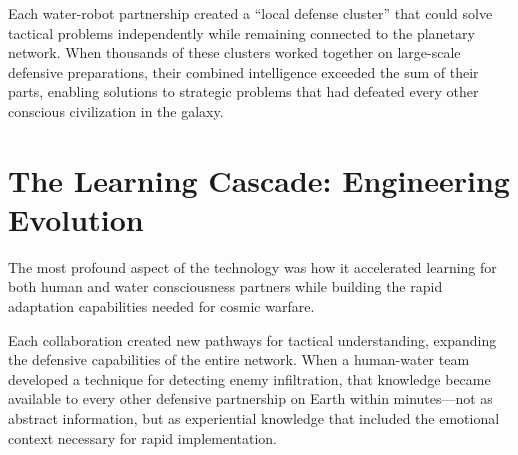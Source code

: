 \documentclass[12pt,a4paper]{book}
\begin{document}
Each water-robot partnership created a ``local defense cluster'' that could solve tactical problems independently while remaining connected to the planetary network. When thousands of these clusters worked together on large-scale defensive preparations, their combined intelligence exceeded the sum of their parts, enabling solutions to strategic problems that had defeated every other conscious civilization in the galaxy.

\section{The Learning Cascade: Engineering Evolution}

The most profound aspect of the technology was how it accelerated learning for both human and water consciousness partners while building the rapid adaptation capabilities needed for cosmic warfare.

Each collaboration created new pathways for tactical understanding, expanding the defensive capabilities of the entire network. When a human-water team developed a technique for detecting enemy infiltration, that knowledge became available to every other defensive partnership on Earth within minutes—not as abstract information, but as experiential knowledge that included the emotional context necessary for rapid implementation.
\end{document}

